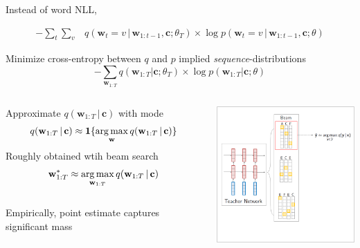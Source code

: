 \documentclass{beamer}
\newcommand{\air}{\vspace{0.25cm}}
\newcommand{\given}{\,|\,}
\newcommand{\wvec}{\mathbf{w}}
\newcommand{\cvec}{\mathbf{c}}
\def\argmax{\operatornamewithlimits{arg\,max}}
\def\argmax{\operatornamewithlimits{arg\,max}}
\begin{document}

\begin{frame}
\centerline{}
\air 
\air
\air  

Instead of word NLL, 

\begin{align*}
-\sum_t \sum_v &q(\wvec_t=v \given \wvec_{1: t-1}, \cvec ; \theta_T)\times  \log p(\wvec_t =v \given \wvec_{1: t-1}, \cvec ; \theta)
\end{align*}
 

Minimize cross-entropy between $q$ and $p$ implied \emph{sequence}-distributions 
\[
 -\sum_{\wvec_{1:T}} q(\wvec_{1:T} | \cvec; \theta_T) \times \log p(\wvec_{1:T} | \cvec ; \theta)
\]
\air


\end{frame}

\begin{frame}
\centerline{}
\air 
\air

\begin{columns}
\begin{column}{6cm}
Approximate $q(\wvec_{1:T} \given \cvec )$ with mode
$$q(\wvec_{1:T} \given \cvec ) \approx \mathbf{1}\{\argmax_{\wvec} q(\wvec_{1:T} \given \cvec )\}$$
\air
Roughly obtained wtih  beam search 
$$ \wvec^*_{1:T} \approx  \argmax_{\wvec_{1:T}} q(\wvec_{1:T} \given \cvec ) $$
\\
Empirically, point estimate captures 
significant mass

\end{column}
\begin{column}{6cm}
\includegraphics[width=6cm]{seq-kd-1}
\end{column}
\end{columns}
\end{frame}
\end{document}
